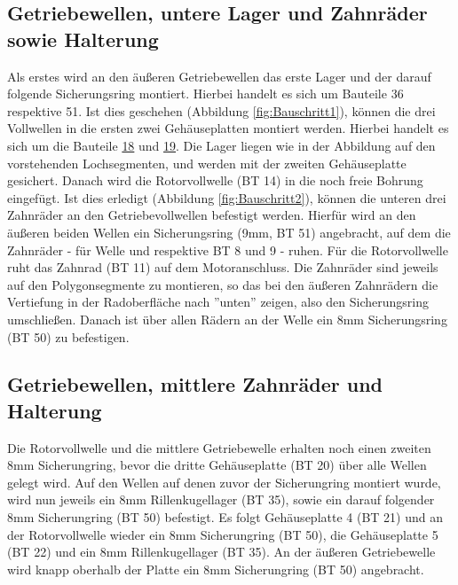 \documentclass[10pt, a4paper]{article}
\newcommand*{\rom}[1]{\expandafter\uppercase\expandafter{\romannumeral #1 \relax}}
\begin{document}
\subsection{Getriebewellen, untere Lager und Zahnräder sowie Halterung}
Als erstes wird an den äußeren Getriebewellen das erste Lager und der darauf folgende Sicherungsring montiert. Hierbei handelt es sich um Bauteile 36 respektive 51. Ist dies geschehen (Abbildung \ref{fig:Bauschritt1}), können die drei Vollwellen in die ersten zwei Gehäuseplatten montiert werden. Hierbei handelt es sich um die Bauteile \hyperlink{list_Platte1}{18} und \hyperlink{list_Platte1}{19}. Die Lager liegen wie in der Abbildung auf den vorstehenden Lochsegmenten, und werden mit der zweiten Gehäuseplatte gesichert. Danach wird die Rotorvollwelle (BT 14) in die noch freie Bohrung eingefügt. Ist dies erledigt (Abbildung \ref{fig:Bauschritt2}), können die unteren drei Zahnräder an den Getriebevollwellen befestigt werden. Hierfür wird an den äußeren beiden Wellen ein Sicherungsring (9mm, BT 51) angebracht, auf dem die Zahnräder - für Welle \rom{1} und \rom{2} respektive BT 8 und 9 - ruhen. Für die Rotorvollwelle ruht das Zahnrad (BT 11) auf dem Motoranschluss. Die Zahnräder sind jeweils auf den Polygonsegmente zu montieren, so das bei den äußeren Zahnrädern die Vertiefung in der Radoberfläche nach ''unten'' zeigen, also den Sicherungsring umschließen. Danach ist über allen Rädern an der Welle ein 8mm Sicherungsring (BT 50) zu befestigen.
\subsection{Getriebewellen, mittlere Zahnräder und \allowbreak Halterung}
Die Rotorvollwelle und die mittlere Getriebewelle erhalten noch einen zweiten 8mm Sicherungring, bevor die dritte Gehäuseplatte (BT 20) über alle Wellen gelegt wird. Auf den Wellen auf denen zuvor der Sicherungring montiert wurde, wird nun jeweils ein 8mm Rillenkugellager (BT 35), sowie ein darauf folgender 8mm Sicherungring (BT 50) befestigt. Es folgt Gehäuseplatte 4 (BT 21) und an der Rotorvollwelle wieder ein 8mm Sicherungring (BT 50), die Gehäuseplatte 5 (BT 22) und ein 8mm Rillenkugellager (BT 35). An der äußeren Getriebewelle wird knapp oberhalb der Platte ein 8mm Sicherungring (BT 50) angebracht.
\newpage
\end{document}
